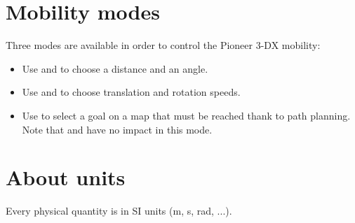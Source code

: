 \let\subsection\subsectionOrig


\section{Mobility modes}
Three modes are available in order to control the Pioneer 3-DX mobility:
\begin{itemize}
\item Use  and  to choose a distance and an angle.
\item Use  and  to choose translation and
  rotation speeds.
\item Use  to select a goal on a map that must be reached thank
  to path planning. Note that  and  have no
  impact in this mode.
\end{itemize}

\section{About units}
Every physical quantity is in SI units (m, s, rad, ...).


